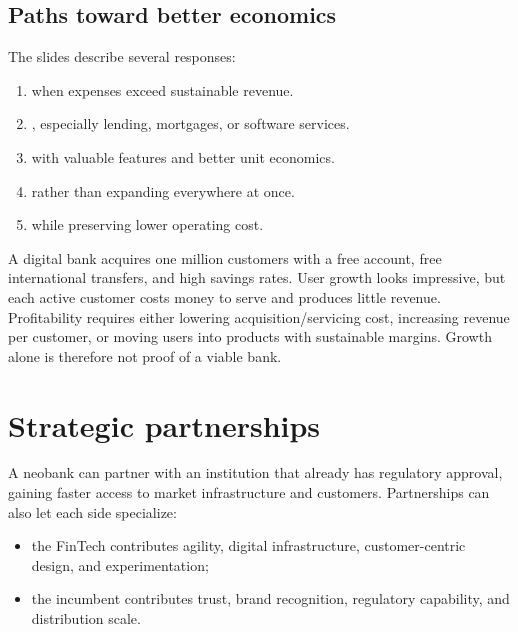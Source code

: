 \subsection{Paths toward better economics}

The slides describe several responses:

\begin{enumerate}
  \item {} when expenses exceed sustainable revenue.
  \item {}, especially lending, mortgages, or software services.
  \item {} with valuable features and better unit economics.
  \item {} rather than expanding everywhere at once.
  \item {} while preserving lower operating cost.
\end{enumerate}

\begin{workedexample}
A digital bank acquires one million customers with a free account, free international transfers, and high savings rates. User growth looks impressive, but each active customer costs money to serve and produces little revenue. Profitability requires either lowering acquisition/servicing cost, increasing revenue per customer, or moving users into products with sustainable margins. Growth alone is therefore not proof of a viable bank.
\end{workedexample}

\section{Strategic partnerships}

A neobank can partner with an institution that already has regulatory approval, gaining faster access to market infrastructure and customers. Partnerships can also let each side specialize:

\begin{itemize}
  \item the FinTech contributes agility, digital infrastructure, customer-centric design, and experimentation;
  \item the incumbent contributes trust, brand recognition, regulatory capability, and distribution scale.
\end{itemize}

